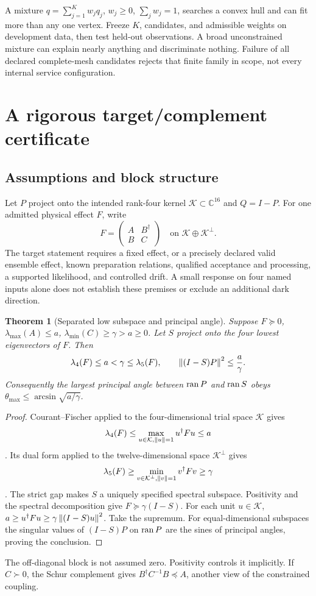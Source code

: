 \documentclass[11pt,a4paper]{article}
\newtheorem{theorem}{Theorem}[section]\newtheorem{lemma}[theorem]{Lemma}\newtheorem{corollary}[theorem]{Corollary}\newtheorem{definition}[theorem]{Definition}\newtheorem{proposition}[theorem]{Proposition}
\begin{document}
A mixture $q=\sum_{j=1}^Kw_jq_j$, $w_j\ge0$, $\sum_jw_j=1$, searches a convex hull and can fit more than any one vertex. Freeze $K$, candidates, and admissible weights on development data, then test held-out observations. A broad unconstrained mixture can explain nearly anything and discriminate nothing. Failure of all declared complete-mesh candidates rejects that finite family in scope, not every internal service configuration.

\section{A rigorous target/complement certificate}
\subsection{Assumptions and block structure}
Let $P$ project onto the intended rank-four kernel $\mathcal K\subset\mathbb C^{16}$ and $Q=I-P$. For one admitted physical effect $F$, write
\begin{equation}
F=\begin{pmatrix}A&B^\dagger\\B&C\end{pmatrix}
\quad\text{on }\mathcal K\oplus\mathcal K^\perp.
\end{equation}
The target statement requires a fixed effect, or a precisely declared valid ensemble effect, known preparation relations, qualified acceptance and processing, a supported likelihood, and controlled drift. A small response on four named inputs alone does not establish these premises or exclude an additional dark direction.

\begin{theorem}[Separated low subspace and principal angle]\label{thm:angle}
Suppose $F\succeq0$, $\lambda_{\max}(A)\le a$, $\lambda_{\min}(C)\ge\gamma> a\ge0$. Let $S$ project onto the four lowest eigenvectors of $F$. Then
\begin{equation}
\lambda_4(F)\le a<\gamma\le\lambda_5(F),\qquad
\left\lVert(I-S)P\right\rVert^2\le\frac a\gamma.
\end{equation}
Consequently the largest principal angle between $\operatorname{ran} P$ and $\operatorname{ran} S$ obeys
$\theta_{\max}\le\arcsin\sqrt{a/\gamma}$.
\end{theorem}
\begin{proof}
Courant--Fischer applied to the four-dimensional trial space $\mathcal K$ gives \[\lambda_4(F)\le\max_{u\in\mathcal K,\left\lVert u\right\rVert=1}u^\dagger Fu\le a\]. Its dual form applied to the twelve-dimensional space $\mathcal K^\perp$ gives \[\lambda_5(F)\ge\min_{v\in\mathcal K^\perp,\left\lVert v\right\rVert=1}v^\dagger Fv\ge\gamma\]. The strict gap makes $S$ a uniquely specified spectral subspace. Positivity and the spectral decomposition give $F\succeq\gamma(I-S)$. For each unit $u\in\mathcal K$,
$a\ge u^\dagger Fu\ge\gamma\left\lVert(I-S)u\right\rVert^2$.
Take the supremum. For equal-dimensional subspaces the singular values of $(I-S)P$ on $\operatorname{ran} P$ are the sines of principal angles, proving the conclusion.
\end{proof}
The off-diagonal block is not assumed zero. Positivity controls it implicitly. If $C\succ0$, the Schur complement gives $B^\dagger C^{-1}B\preceq A$, another view of the constrained coupling.
\end{document}
